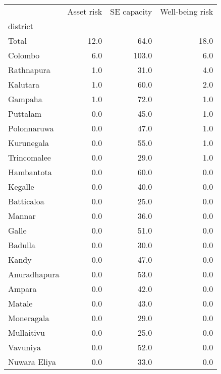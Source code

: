 \begin{tabular}{lrrr}
\toprule
{} &  Asset risk &  SE capacity &  Well-being risk \\
district     &             &              &                  \\
\midrule
Total        &        12.0 &         64.0 &             18.0 \\
Colombo      &         6.0 &        103.0 &              6.0 \\
Rathnapura   &         1.0 &         31.0 &              4.0 \\
Kalutara     &         1.0 &         60.0 &              2.0 \\
Gampaha      &         1.0 &         72.0 &              1.0 \\
Puttalam     &         0.0 &         45.0 &              1.0 \\
Polonnaruwa  &         0.0 &         47.0 &              1.0 \\
Kurunegala   &         0.0 &         55.0 &              1.0 \\
Trincomalee  &         0.0 &         29.0 &              1.0 \\
Hambantota   &         0.0 &         60.0 &              0.0 \\
Kegalle      &         0.0 &         40.0 &              0.0 \\
Batticaloa   &         0.0 &         25.0 &              0.0 \\
Mannar       &         0.0 &         36.0 &              0.0 \\
Galle        &         0.0 &         51.0 &              0.0 \\
Badulla      &         0.0 &         30.0 &              0.0 \\
Kandy        &         0.0 &         47.0 &              0.0 \\
Anuradhapura &         0.0 &         53.0 &              0.0 \\
Ampara       &         0.0 &         42.0 &              0.0 \\
Matale       &         0.0 &         43.0 &              0.0 \\
Moneragala   &         0.0 &         29.0 &              0.0 \\
Mullaitivu   &         0.0 &         25.0 &              0.0 \\
Vavuniya     &         0.0 &         52.0 &              0.0 \\
Nuwara Eliya &         0.0 &         33.0 &              0.0 \\
\bottomrule
\end{tabular}
